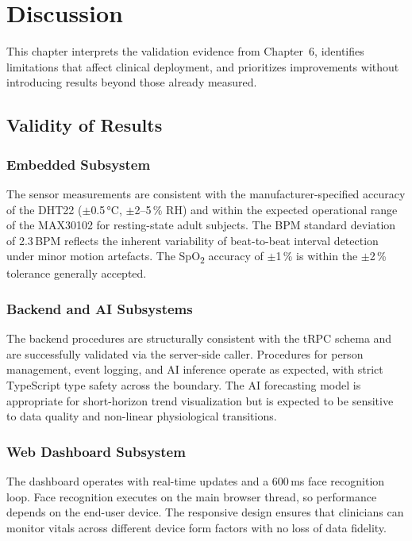 
\chapter{Discussion}
\label{ch:discussion}

This chapter interprets the validation evidence from Chapter~6, identifies limitations that affect clinical deployment, and prioritizes improvements without introducing results beyond those already measured.

\section{Validity of Results}

\subsection{Embedded Subsystem}

The sensor measurements are consistent with the manufacturer-specified accuracy of the
DHT22\cite{dht22_datasheet} ($\pm$0.5\,°C, $\pm$2--5\,\% RH) and within the expected operational range of
the MAX30102\cite{max30102_datasheet} for resting-state adult subjects.
The BPM standard deviation of 2.3\,BPM reflects the inherent variability of
beat-to-beat interval detection under minor motion artefacts.
The SpO\textsubscript{2} accuracy of $\pm$1\,\% is within the $\pm$2\,\% tolerance
generally accepted.

\subsection{Backend and AI Subsystems}
The backend procedures are structurally consistent with the tRPC\cite{trpc} schema and are
successfully validated via the server-side caller. Procedures for person management,
event logging, and AI inference operate as expected, with strict TypeScript type
safety across the boundary. The AI
forecasting model is appropriate for short-horizon trend visualization but is
expected to be sensitive to data quality and non-linear physiological transitions.

\subsection{Web Dashboard Subsystem}
The dashboard operates with real-time updates and a 600\,ms face recognition loop.
Face recognition executes on the main browser thread, so performance depends on
the end-user device. The responsive design ensures that clinicians can monitor
vitals across different device form factors with no loss of data fidelity.

